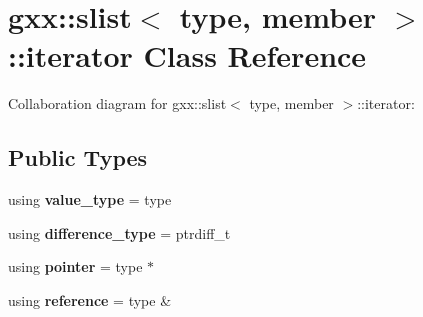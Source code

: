 \hypertarget{classgxx_1_1slist_1_1iterator}{}\section{gxx\+:\+:slist$<$ type, member $>$\+:\+:iterator Class Reference}
\label{classgxx_1_1slist_1_1iterator}


Collaboration diagram for gxx\+:\+:slist$<$ type, member $>$\+:\+:iterator\+:
\subsection*{Public Types}
\begin{DoxyCompactItemize}
\item 
using {\bfseries value\+\_\+type} = type\hypertarget{classgxx_1_1slist_1_1iterator_acd281a956a7eaef62a5cf96659b747f7}{}\label{classgxx_1_1slist_1_1iterator_acd281a956a7eaef62a5cf96659b747f7}

\item 
using {\bfseries difference\+\_\+type} = ptrdiff\+\_\+t\hypertarget{classgxx_1_1slist_1_1iterator_a9d03ce6d449a898c70a69eeaa9773432}{}\label{classgxx_1_1slist_1_1iterator_a9d03ce6d449a898c70a69eeaa9773432}

\item 
using {\bfseries pointer} = type $\ast$\hypertarget{classgxx_1_1slist_1_1iterator_ab081f836da253cee99f486c08a1b83bd}{}\label{classgxx_1_1slist_1_1iterator_ab081f836da253cee99f486c08a1b83bd}

\item 
using {\bfseries reference} = type \&\hypertarget{classgxx_1_1slist_1_1iterator_ab185b3ee88fcb12b7043f4ef101e52fe}{}\label{classgxx_1_1slist_1_1iterator_ab185b3ee88fcb12b7043f4ef101e52fe}

\end{DoxyCompactItemize}
